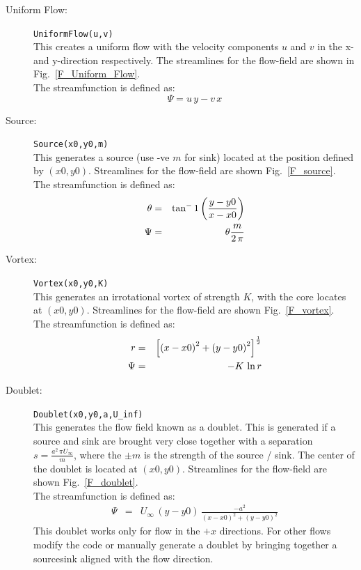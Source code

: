 \documentclass[10pt,a4paper]{article}
\begin{document}
\begin{description}
\item[Uniform Flow:] \verb'UniformFlow(u,v)' \\ This creates a uniform flow with the velocity components $u$ and $v$ in the x- and y-direction respectively. 
The streamlines for the flow-field are shown in Fig.~\ref{F_Uniform_Flow}. \\
The streamfunction is defined as: 
\begin{equation}
\Psi = u \, y - v \, x
\end{equation}

\item[Source:] \verb'Source(x0,y0,m)' \\ This generates a source (use -ve $m$ for sink) located at the position defined by $(x0,y0)$. 
Streamlines for the flow-field are shown Fig.~\ref{F_source}. \\
The streamfunction is defined as: 
\begin{eqnarray}
\noindent \theta &=& \tan^-1 \left( \frac{ y -y0}{x-x0} \right)\\
\Psi &=& \theta \frac{m}{2 \, \pi}
\end{eqnarray}

\item[Vortex:] \verb'Vortex(x0,y0,K)' \\ This generates an irrotational vortex of strength $K$, with the core locates at $(x0,y0)$. 
Streamlines for the flow-field are shown Fig.~\ref{F_vortex}. \\
The streamfunction is defined as: 
\begin{eqnarray}
\noindent r &=&  \left[ \left( x-x0 \right)^2  +  \left( y-y0 \right)^2  \right]^{\frac{1}{2}} \\
\Psi &=& -K \, \ln r
\end{eqnarray}

\item[Doublet:] \verb'Doublet(x0,y0,a,U_inf)' \\ 
This generates the flow field known as a doublet. 
This is generated if a source and sink are brought very close together with a separation $s = \frac{a^2 \, \pi U_{\infty}}{m}$, where the $\pm m$ is the strength of the source / sink. 
The center of the doublet is located at $(x0,y0)$. 
Streamlines for the flow-field are shown Fig.~\ref{F_doublet}. \\
The streamfunction is defined as: 
\begin{eqnarray}
\Psi &=& U_{\infty} \, \left(y - y0\right) \, \frac{ - a^2}{  \left(x-x0\right)^2 + \left(y-y0\right)^2 }   
\end{eqnarray}
This doublet works only for flow in the $+x$ directions. 
For other flows modify the code or manually generate a doublet by bringing together a sourcesink aligned with the flow direction. 


\end{description}
\end{document}
